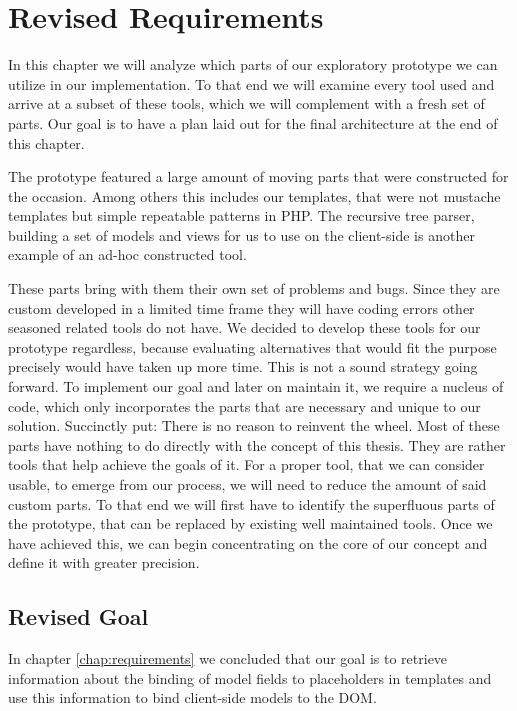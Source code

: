 \documentclass[thesis.tex]{subfiles}
\begin{document}
\chapter{Revised Requirements}
\label{chap:revised}
In this chapter we will analyze which parts of our exploratory prototype we can
utilize in our implementation. To that end we will examine every tool used and
arrive at a subset of these tools, which we will complement with a fresh set of
parts. Our goal is to have a plan laid out for the final architecture at the end
of this chapter.

The prototype featured a large amount of moving parts that were constructed for
the occasion. Among others this includes our templates, that were not mustache
templates but simple repeatable patterns in PHP. The recursive tree parser,
building a set of models and views for us to use on the client-side is another
example of an ad-hoc constructed tool.

These parts bring with them their own set of problems and bugs.
Since they are custom developed in a limited time frame they will have coding
errors other seasoned related tools do not have.
We decided to develop these tools for our prototype regardless,
because evaluating alternatives that would fit the purpose precisely
would have taken up more time.
This is not a sound strategy going forward. To implement our goal and later on
maintain it, we require a nucleus of code, which only incorporates the parts
that are necessary and unique to our solution.
Succinctly put: There is no reason to reinvent the wheel.
Most of these parts have nothing to do directly with the concept of this thesis.
They are rather tools that help achieve the goals of it.
For a proper tool, that we can consider usable, to emerge from our process,
we will need to reduce the amount of said custom parts.
To that end we will first have to identify the superfluous parts of the
prototype, that can be replaced by existing well maintained tools. Once we have
achieved this, we can begin concentrating on the core of our concept and define
it with greater precision.

\section{Revised Goal}
\label{sec:revised-goal}
In chapter \ref{chap:requirements} we concluded that our goal is to retrieve
information about the binding of model fields to placeholders in templates and
use this information to bind client-side models to the DOM.
\end{document}
